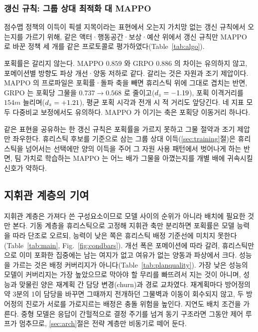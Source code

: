 \subsubsection{갱신 규칙: 그룹 상대 최적화 대 MAPPO}
\label{sec:res_algo}

점수맵 정책의 이득이 픽셀 지목이라는 표현에서 오는지 가치망 없는 갱신 규칙에서 오는지를
가르기 위해, 같은 액터·행동공간·보상·예산 위에서 갱신 규칙만 MAPPO 로 바꾼 정책 세 개를 같은
프로토콜로 평가하였다(Table~\ref{tab:algo}).


포획률은 갈리지 않는다. MAPPO $0.859$ 와 GRPO $0.886$ 의 차이는 유의하지 않고, 포메이션별
방향도 파상 개선·양동 저하로 같다. 갈리는 것은 자원과 조기 제압이다. MAPPO 의 프로파일은
포획률·돌파 축을 빼면 휴리스틱 위에 그대로 겹치는 반면, GRPO 는 포획당 그물을
$0.737 \to 0.568$ 로 줄이고($d_z = -1.19$), 포획 이격거리를 $154\unit{m}$ 늘리며($d_z = +1.21$),
평균 포획 시각과 전개 시 적 거리도 앞당긴다. 네 지표 모두 다중비교 보정에서도 유의하다.
MAPPO 가 이기는 축은 포획당 이동거리 하나다.

같은 표현을 공유하는 한 갱신 규칙은 포획률을 가르지 못하고 그물 절약과 조기 제압만
좌우한다. 휴리스틱 후보를 기준으로 삼는 그룹 상대 이득(\ref{sec:training}절)은 휴리스틱을
넘어서는 선택에만 양의 이득을 주어 그 자원 사용 패턴에서 벗어나게 하는 반면, 팀 가치로
학습하는 MAPPO 는 어느 배가 그물을 아꼈는지를 개별 배에 귀속시킬 신호가 약하다.

\subsection{지휘관 계층의 기여}
\label{sec:res_g2}
\label{sec:res_main}
\label{sec:res_threshold}
\label{sec:res_ceiling}
\label{sec:res_mechanism}
\label{sec:res_latency}

지휘관 계층은 가져다 쓴 구성요소이므로 모델 사이의 순위가 아니라 배치에 필요한 것만 본다.
기동 계층을 휴리스틱으로 고정해 지휘관 축만 분리하면 포획률은 모델 능력을 따라 단조로 오르되,
능력이 낮은 쪽은 휴리스틱 배정 기준선에 미치지 못한다(Table~\ref{tab:main},
Fig.~\ref{fig:condbars}). 개선 폭은 포메이션에 따라 갈려, 휴리스틱만으로 이미 포화한 집중에는
남는 여지가 없고 여유가 없는 양동과 파상에서 크다. 성능을 가르는 것은 배정
커버리지가 아니다(Table~\ref{tab:planquality}). 가장 낮은 성능의 모델이 커버리지는 가장
높았으므로 막아야 할 무리를 빠뜨려서 지는 것이 아니며, 성능과 맞물린 양은 재계획 간 담당
변경(churn)과 경로 교차였다. 재계획마다 방어정의 약 3분의 1이 담당을 바꾸면 그때까지 전개하던
그물벽과 이동이 회수되지 않고, 두 방어정의 진로가 서로를 가로지르는 배정은 충돌 위험을 높인다.
지연도 배치 조건을 가른다. 중형 모델은 응답이 간헐적으로 결정 주기를 넘겨 동기 구조라면 그동안
제어 루프가 멈추므로, \ref{sec:arch}절은 전략 계층만 비동기로 떼어 둔다.

